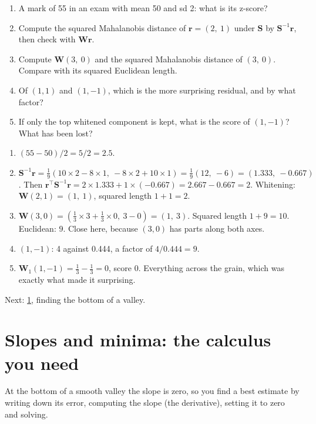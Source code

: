 \documentclass[11pt,a4paper,oneside,openany]{book}
\newcommand{\B}[1]{{\symbf{#1}}}
\newcommand{\B}[1]{{\bm{#1}}}
\newcommand{\T}{^{\top}}
\newcommand{\vr}{\B{r}}
\newcommand{\mS}{\B{S}}
\newcommand{\mW}{\B{W}}
\newcommand{\nextchapter}[1]{\par\medskip\noindent\hfill\textsf{\small Next: #1}\par}
\begin{document}
\begin{checkyourself}
\begin{enumerate}
\item A mark of 55 in an exam with mean 50 and sd 2: what is its z-score?
\item Compute the squared Mahalanobis distance of $\vr=(2,\ 1)$ under $\mS$ by $\mS^{-1}\vr$, then check with $\mW\vr$.
\item Compute $\mW(3,\ 0)$ and the squared Mahalanobis distance of $(3,\ 0)$. Compare with its squared Euclidean length.
\item Of $(1,1)$ and $(1,-1)$, which is the more surprising residual, and by what factor?
\item If only the top whitened component is kept, what is the score of $(1,-1)$? What has been lost?
\end{enumerate}
\end{checkyourself}

\begin{answers}
\begin{enumerate}
\item $(55-50)/2=5/2=2.5$.
\item $\mS^{-1}\vr=\frac19(10\times2-8\times1,\ -8\times2+10\times1)=\frac19(12,\ -6)=(1.333,\ -0.667)$. Then
  $\vr\T\mS^{-1}\vr=2\times1.333+1\times(-0.667)=2.667-0.667=2$. Whitening: $\mW(2,1)=(1,\ 1)$, squared length $1+1=2$.
\item $\mW(3,0)=(\frac13\times3+\frac13\times0,\ 3-0)=(1,\ 3)$. Squared length $1+9=10$. Euclidean: $9$. Close here,
  because $(3,0)$ has parts along both axes.
\item $(1,-1)$: 4 against 0.444, a factor of $4/0.444=9$.
\item $\mW_1(1,-1)=\frac13-\frac13=0$, score 0. Everything across the grain, which was exactly what made it surprising.
\end{enumerate}
\end{answers}

\nextchapter{\cref{ch:calculus}, finding the bottom of a valley.}
\chapter{Slopes and minima: the calculus you need}
\label{ch:calculus}

\begin{onething}
At the bottom of a smooth valley the slope is zero, so you find a best estimate by writing down its error, computing the
slope (the derivative), setting it to zero and solving.
\end{onething}
\end{document}
